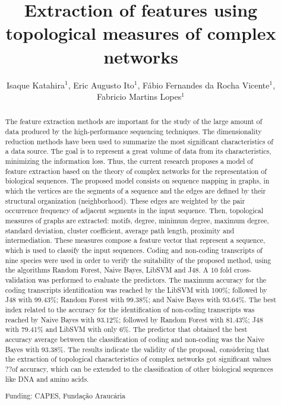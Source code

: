 \documentclass[twoside]{article}
\title{\vspace{-15mm}\fontsize{24pt}{10pt}\selectfont\textbf{Extraction of features using topological measures of complex networks}} %
\author{Isaque Katahira$^1$, Eric Augusto Ito$^1$, F\'abio Fernandes da Rocha Vicente$^1$, Fabricio Martins Lopes$^1$}
\affil{1 FEDERAL TECHNOLOGICAL UNIVERSITY OF PARAN\'A\\ }
\date{}
\begin{document}
\maketitle %

\thispagestyle{fancy} %


\begin{abstract}
The feature extraction methods are important for the study of the large amount of data produced by the high-performance sequencing techniques. The dimensionality reduction methods have been used to summarize the most significant characteristics of a data source. The goal is to represent a great volume of data from its characteristics, minimizing the information loss. Thus, the current research proposes a model of feature extraction based on the theory of complex networks for the representation of biological sequences. The proposed model consists on sequence mapping in graphs, in which the vertices are the segments of a sequence and the edges are defined by their structural organization (neighborhood). These edges are weighted by the pair occurrence frequency of adjacent segments in the input sequence. Then, topological measures of graphs are extracted: motifs, degree, minimum degree, maximum degree, standard deviation, cluster coefficient, average path length, proximity and intermediation. These measures compose a feature vector that represent a sequence, which is used to classify the input sequences. Coding and non-coding transcripts of nine species were used in order to verify the suitability of the proposed method, using the algorithms Random Forest, Naive Bayes, LibSVM and J48. A 10 fold cross-validation was performed to evaluate the predictors. The maximum accuracy for the coding transcripts identification was reached by the LibSVM with 100\%; followed by J48 with 99.43\%; Random Forest with 99.38\%; and Naive Bayes with 93.64\%. The best index related to the accuracy for the identification of non-coding transcripts was reached by Naive Bayes with 93.12\%; followed by Random Forest with 81.43\%; J48 with 79.41\% and LibSVM with only 6\%. The predictor that obtained the best accuracy average between the classification of coding and non-coding was the Naive Bayes with 93.38\%. The results indicate the validity of the proposal, considering that the extraction of topological characteristics of complex networks got significant values ??of accuracy, which can be extended to the classification of other biological sequences like DNA and amino acids.

Funding: CAPES, Funda\c{c}\~ao Arauc\'aria
\end{abstract}
\end{document}
